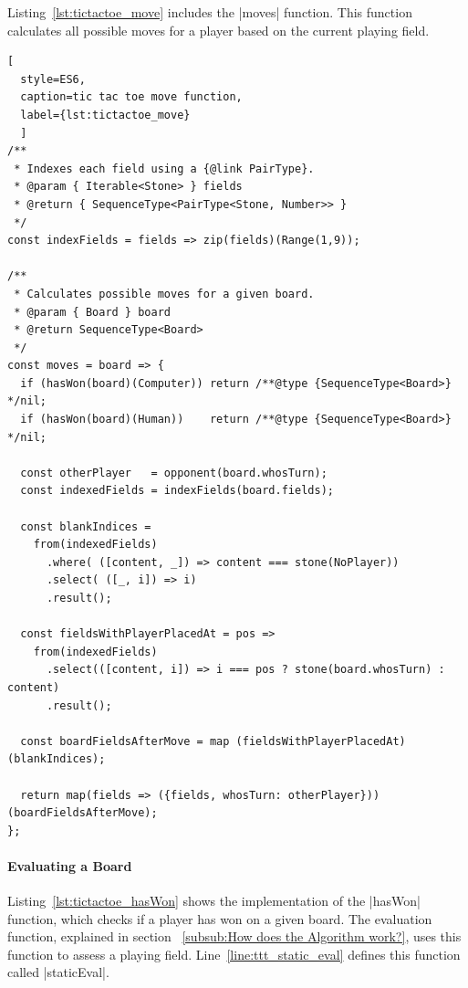 Listing~\ref{lst:tictactoe_move} includes the |moves| function. This function
calculates all possible moves for a player based on the current playing field.
\begin{lstlisting}[
  style=ES6, 
  caption=tic tac toe move function,
  label={lst:tictactoe_move}
  ]
/**
 * Indexes each field using a {@link PairType}.
 * @param { Iterable<Stone> } fields
 * @return { SequenceType<PairType<Stone, Number>> }
 */
const indexFields = fields => zip(fields)(Range(1,9));

/**
 * Calculates possible moves for a given board.
 * @param { Board } board
 * @return SequenceType<Board>
 */
const moves = board => {
  if (hasWon(board)(Computer)) return /**@type {SequenceType<Board>} */nil;
  if (hasWon(board)(Human))    return /**@type {SequenceType<Board>} */nil;

  const otherPlayer   = opponent(board.whosTurn);
  const indexedFields = indexFields(board.fields);

  const blankIndices =
    from(indexedFields)
      .where( ([content, _]) => content === stone(NoPlayer))
      .select( ([_, i]) => i)
      .result();

  const fieldsWithPlayerPlacedAt = pos =>
    from(indexedFields)
      .select(([content, i]) => i === pos ? stone(board.whosTurn) : content)
      .result();

  const boardFieldsAfterMove = map (fieldsWithPlayerPlacedAt) (blankIndices);

  return map(fields => ({fields, whosTurn: otherPlayer})) (boardFieldsAfterMove);
};
\end{lstlisting}

\paragraph{Evaluating a Board}
Listing~\ref{lst:tictactoe_hasWon} shows the implementation of the |hasWon|
function, which checks if a player has won on a given board. The evaluation
function, explained in section ~\ref{subsub:How does the Algorithm work?}, uses
this function to assess a playing field. Line~\ref{line:ttt_static_eval}
defines this function called |staticEval|.

